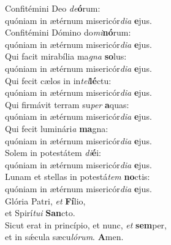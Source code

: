 \evenverse Confitémini Deo \textit{de}\textbf{ó}rum:~\*\\
\evenverse quóniam in ætérnum misericór\textit{di}\textit{a} \textbf{e}jus.\\
\oddverse Confitémini Dómino do\textit{mi}\textbf{nó}rum:~\*\\
\oddverse quóniam in ætérnum misericór\textit{di}\textit{a} \textbf{e}jus.\\
\evenverse Qui facit mirabília ma\textit{gna} \textbf{so}lus:~\*\\
\evenverse quóniam in ætérnum misericór\textit{di}\textit{a} \textbf{e}jus.\\
\oddverse Qui fecit cælos in in\textit{tel}\textbf{lé}ctu:~\*\\
\oddverse quóniam in ætérnum misericór\textit{di}\textit{a} \textbf{e}jus.\\
\evenverse Qui firmávit terram su\textit{per} \textbf{a}quas:~\*\\
\evenverse quóniam in ætérnum misericór\textit{di}\textit{a} \textbf{e}jus.\\
\oddverse Qui fecit luminári\textit{a} \textbf{ma}gna:~\*\\
\oddverse quóniam in ætérnum misericór\textit{di}\textit{a} \textbf{e}jus.\\
\evenverse Solem in potestátem \textit{di}\textbf{é}i:~\*\\
\evenverse quóniam in ætérnum misericór\textit{di}\textit{a} \textbf{e}jus.\\
\oddverse Lunam et stellas in potestá\textit{tem} \textbf{no}ctis:~\*\\
\oddverse quóniam in ætérnum misericór\textit{di}\textit{a} \textbf{e}jus.\\
\evenverse Glória Patri, \textit{et} \textbf{Fí}lio,~\*\\
\evenverse et Spirí\textit{tu}\textit{i} \textbf{San}cto.\\
\oddverse Sicut erat in princípio, et nunc, \textit{et} \textbf{sem}per,~\*\\
\oddverse et in sǽcula sæcu\textit{ló}\textit{rum}. \textbf{A}men.\\
